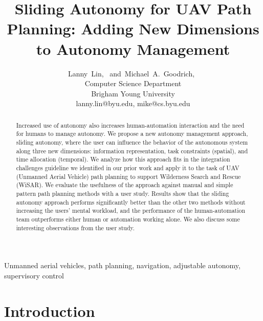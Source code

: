 \documentclass[journal]{IEEEtran}
\begin{document}
\title{Sliding Autonomy for UAV Path Planning: Adding New Dimensions to Autonomy Management}

\author{
Lanny~Lin,~
and~Michael~A.~Goodrich,~%
\\Computer Science Department \\ Brigham Young University \\ lanny.lin@byu.edu, mike@cs.byu.edu
}

\maketitle

\begin{abstract}
Increased use of autonomy also increases human-automation interaction and the need for humans to manage autonomy. We propose a new autonomy management approach, sliding autonomy, where the user can influence the behavior of the autonomous system along three new dimensions: information representation, task constraints (spatial), and time allocation (temporal). We analyze how this approach fits in the integration challenges guideline we identified in our prior work and apply it to the task of UAV (Unmanned Aerial Vehicle) path planning to support Wilderness Search and Rescue (WiSAR). We evaluate the usefulness of the approach against manual and simple pattern path planning methods with a user study. Results show that the sliding autonomy approach performs significantly better than the other two methods without increasing the users' mental workload, and the performance of the human-automation team outperforms either human or automation working alone. We also discuss some interesting observations from the user study.
\end{abstract}


\begin{IEEEkeywords}
Unmanned aerial vehicles, path planning, navigation, adjustable autonomy, supervisory control
\end{IEEEkeywords}

\IEEEpeerreviewmaketitle


\section{Introduction}
\label{sec:Introduction6}
\end{document}
